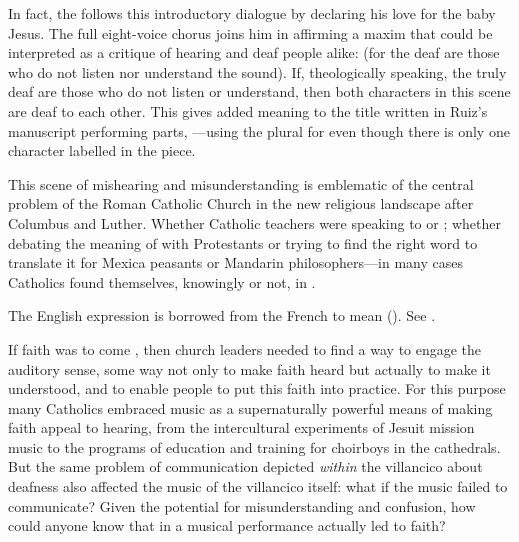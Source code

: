 In fact, the  follows this introductory dialogue by declaring his
love for the baby Jesus. 
The full eight-voice chorus joins him in affirming a maxim that could be
interpreted as a critique of hearing and deaf people alike: 
 (for the deaf
are those who do not listen nor understand the sound).
If, theologically speaking, the truly deaf are those who do not listen or
understand, then both characters in this scene are deaf to each other.
This gives added meaning to the title written in Ruiz's manuscript performing
parts, ---using the plural for  even
though there is only one character labelled  in the piece.

This scene of mishearing and misunderstanding is emblematic of the central
problem of the Roman Catholic Church in the new religious landscape after
Columbus and Luther.
Whether Catholic teachers were speaking to  or ;
whether debating the meaning of  with Protestants or trying to find
the right word to translate it for Mexica peasants or Mandarin philosophers---in
many cases Catholics found themselves, knowingly or not, in .%
\begin{Footnote}
    The English expression is borrowed from the French 
    to mean 
    (\autocite[]{OED}).
    See \autocite{MacGaffey:DialoguesDeaf}. %
\end{Footnote}

If faith was to come , then church leaders needed to
find a way to engage the auditory sense, some way not only to make faith heard
but actually to make it understood, and to enable people to put this faith into
practice.
For this purpose many Catholics embraced music as a supernaturally powerful
means of making faith appeal to hearing, from the intercultural experiments of
Jesuit mission music to the programs of education and training for choirboys in
the cathedrals.
But the same problem of communication depicted \emph{within} the villancico
about deafness also affected the music of the villancico itself: what if the
music failed to communicate?
Given the potential for misunderstanding and confusion, how could anyone know
that  in a musical performance actually led to faith?

